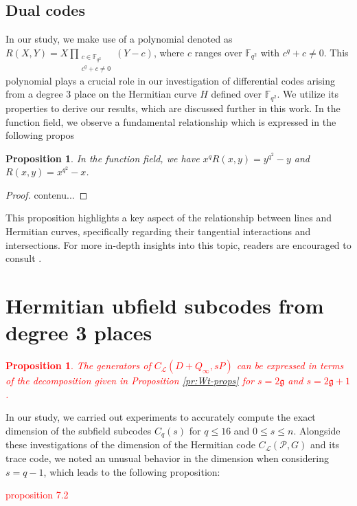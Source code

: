 \documentclass[a4paper]{amsart}
\theoremstyle{plain}
\newtheorem{proposition}[theorem]{Proposition}
\theoremstyle{definition}
\theoremstyle{remark}
\newcommand{\g}{\mathfrak{g}}
\begin{document}
\subsection{Dual codes}

In our study, we make use of a polynomial denoted as $R(X,Y) = X \prod\limits_{\substack{c \in \mathbb{F}_{q^2} \\ c^q + c \neq 0}} (Y-c)$, where $c$ ranges over $\mathbb{F}_{q^2}$ with $c^q + c \neq 0$. This polynomial plays a crucial role in our investigation of differential codes arising from a degree 3 place on the Hermitian curve $H$ defined over $\mathbb{F}_{q^2}$. We utilize its properties to derive our results, which are discussed further in this work.
In the function field, we observe a fundamental relationship which is expressed in the following propos
\begin{proposition}
	In the function field, we have $x^{q}R(x, y) = y^{q^2} - y$ and $R(x, y) = x^{q^2} - x$.
\end{proposition} 
\begin{proof}
	contenu...
\end{proof}
This proposition highlights a key aspect of the relationship between lines and Hermitian curves, specifically regarding their tangential interactions and intersections. For more in-depth insights into this topic, readers are encouraged to consult \cite[Section~2]{korchmaros2013hermitian}.


\section{Hermitian ubfield subcodes from degree 3 places}


\textcolor{red}{\begin{proposition}
	The generators of $C_{\mathcal{L}}\left(D+Q_{\infty}, s P\right)$ can be expressed in terms of the decomposition given in Proposition \ref{pr:Wt-props} for $s=2 \g$ and $s=2 \g+1$.
\end{proposition}}

In our study, we carried out experiments to accurately compute the exact dimension of the subfield subcodes $ C_{q}(s) $ for $ q \leq 16 $ and $0 \leq s \leq n$. Alongside these investigations of the dimension of the Hermitian code $ C_{\mathcal{L}}(\mathcal{P}, G) $ and its trace code, we noted an unusual behavior in the dimension when considering $s = q - 1 $, which leads to the following proposition:


\textcolor{red}{proposition 7.2 }
\end{document}

